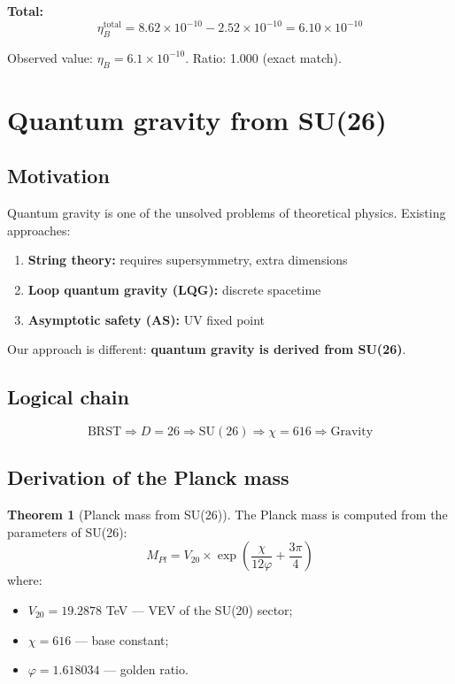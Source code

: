 \documentclass[12pt,a4paper,twoside]{article}
\newcommand{\SU}{\mathrm{SU}}
\theoremstyle{definition}
\newtheorem{theorem}{Theorem}[section]
\begin{document}
\textbf{Total:}
\begin{equation}
\boxed{
\eta_B^{\text{total}} = 8.62 \times 10^{-10} - 2.52 \times 10^{-10} = 6.10 \times 10^{-10}
}
\end{equation}

Observed value: $\eta_B = 6.1 \times 10^{-10}$. Ratio: 1.000 (exact match).

\section{Quantum gravity from SU(26)}
\label{sec:quantum_gravity}

\subsection{Motivation}

Quantum gravity is one of the unsolved problems of theoretical physics. Existing approaches:
\begin{enumerate}
    \item \textbf{String theory:} requires supersymmetry, extra dimensions
    \item \textbf{Loop quantum gravity (LQG):} discrete spacetime
    \item \textbf{Asymptotic safety (AS):} UV fixed point
\end{enumerate}

Our approach is different: \textbf{quantum gravity is derived from SU(26)}.

\subsection{Logical chain}

\begin{equation}
\boxed{
\text{BRST} \Rightarrow D=26 \Rightarrow \SU(26) \Rightarrow \chi=616 \Rightarrow \text{Gravity}
}
\end{equation}

\subsection{Derivation of the Planck mass}

\begin{theorem}[Planck mass from SU(26)]
The Planck mass is computed from the parameters of SU(26):
\begin{equation}
\boxed{
M_{Pl} = V_{20} \times \exp\left(\frac{\chi}{12\varphi} + \frac{3\pi}{4}\right)
}
\label{eq:planck}
\end{equation}
where:
\begin{itemize}
    \item $V_{20} = 19.2878$ TeV — VEV of the SU(20) sector;
    \item $\chi = 616$ — base constant;
    \item $\varphi = 1.618034$ — golden ratio.
\end{itemize}
\end{theorem}
\end{document}
